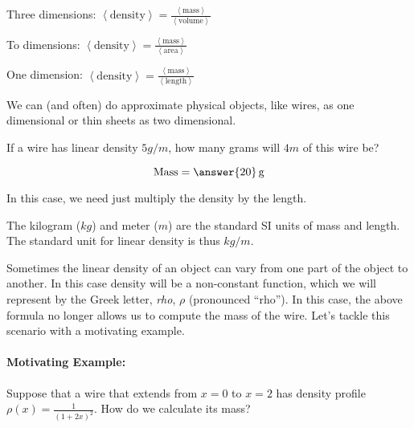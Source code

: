 \documentclass{ximera}
\begin{document}
Three dimensions: $\left<\textrm{density}\right> = \frac{\left<\textrm{mass}\right>}{\left<\textrm{volume}\right>}$

To dimensions: $\left<\textrm{density}\right> = \frac{\left<\textrm{mass}\right>}{\left<\textrm{area}\right>}$

One dimension: $\left<\textrm{density}\right> = \frac{\left<\textrm{mass}\right>}{\left<\textrm{length}\right>}$

We can (and often) do approximate physical objects, like wires, as one dimensional or thin sheets as two dimensional. 

\begin{question}
  If a wire has linear density $5 \unit{g}/\unit{m}$, how many grams
  will $4 \unit{m}$ of this wire be?
  \begin{prompt}
  \[
  \mathrm{Mass} = \answer{20} \unit{g}
  \]
  \end{prompt}
  \begin{hint}
    In this case, we need just multiply the density by the length.
  \end{hint}
\end{question}

\begin{fact}
The kilogram ($kg$) and meter ($m$) are the standard SI units of mass and length.  The standard unit for linear density is thus $kg/m$.
\end{fact}

Sometimes the linear density of an object can vary from one part of
the object to another. In this case density will be a non-constant function, which we will represent by the Greek letter, \textit{rho}, $\rho$ (pronounced ``rho'').  In this case, the above formula no longer allows us to compute the mass of the wire.  Let's tackle this scenario with a motivating example.

\paragraph{Motivating Example:} Suppose that a wire that extends from $x=0$ to $x=2$ has density profile $\rho(x) = \frac{1}{(1+2x)^2}$.  How do we calculate its mass?

\begin{multipleChoice}
\end{multipleChoice}
\end{document}

